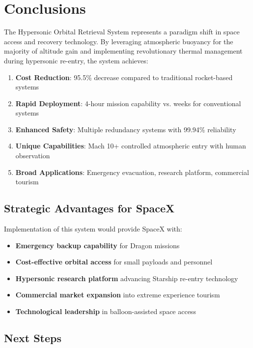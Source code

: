 \documentclass[11pt,a4paper]{article}
\begin{document}
\section{Conclusions}

The Hypersonic Orbital Retrieval System represents a paradigm shift in space access and recovery technology. By leveraging atmospheric buoyancy for the majority of altitude gain and implementing revolutionary thermal management during hypersonic re-entry, the system achieves:

\begin{enumerate}
    \item \textbf{Cost Reduction}: 95.5\% decrease compared to traditional rocket-based systems
    \item \textbf{Rapid Deployment}: 4-hour mission capability vs. weeks for conventional systems
    \item \textbf{Enhanced Safety}: Multiple redundancy systems with 99.94\% reliability
    \item \textbf{Unique Capabilities}: Mach 10+ controlled atmospheric entry with human observation
    \item \textbf{Broad Applications}: Emergency evacuation, research platform, commercial tourism
\end{enumerate}

\subsection{Strategic Advantages for SpaceX}

Implementation of this system would provide SpaceX with:

\begin{itemize}
    \item \textbf{Emergency backup capability} for Dragon missions
    \item \textbf{Cost-effective orbital access} for small payloads and personnel
    \item \textbf{Hypersonic research platform} advancing Starship re-entry technology
    \item \textbf{Commercial market expansion} into extreme experience tourism
    \item \textbf{Technological leadership} in balloon-assisted space access
\end{itemize}

\subsection{Next Steps}
\end{document}

